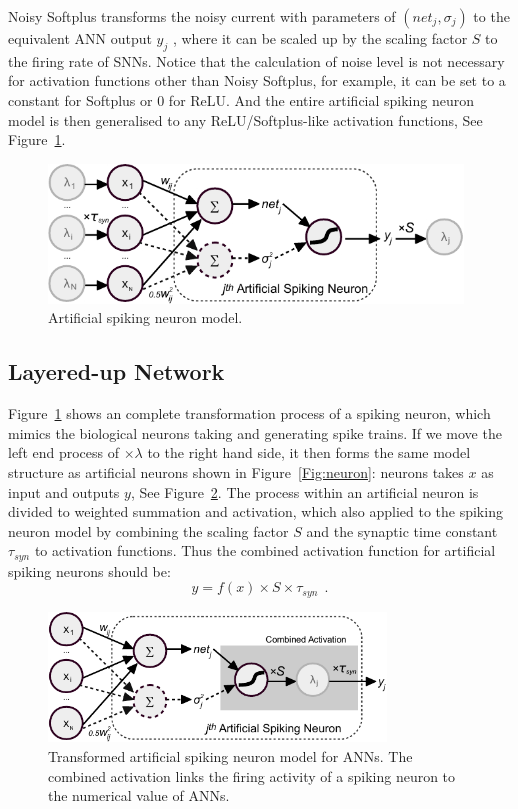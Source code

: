 	
	Noisy Softplus transforms the noisy current with parameters of $(net_j, \sigma_j)$ to the equivalent ANN output $y_j$ , where it can be scaled up by the scaling factor $S$ to the firing rate of SNNs.
	Notice that the calculation of noise level is not necessary for activation functions other than Noisy Softplus, for example, it can be set to a constant for Softplus or 0 for ReLU.
	And the entire artificial spiking neuron model is then generalised to any ReLU/Softplus-like activation functions, See Figure~\ref{Fig:sneuron}.
	
	\begin{figure}[bt]
		\centering
		\includegraphics[width=0.98\textwidth]{pics_sdlm/neuron_o.pdf}
		\caption{Artificial spiking neuron model. }
		\label{Fig:sneuron}
	\end{figure}
	
	
	\subsection{Layered-up Network}
	
	Figure~\ref{Fig:sneuron} shows an complete transformation process of a spiking neuron, which mimics the biological neurons taking and generating spike trains.
	If we move the left end process of $\times \lambda$ to the right hand side, it then forms the same model structure as artificial neurons shown in Figure~\ref{Fig:neuron}: neurons takes $x$ as input and outputs $y$, See Figure~\ref{Fig:tneuron}.
	The process within an artificial neuron is divided to weighted summation and activation, which also applied to the spiking neuron model by combining the scaling factor $S$ and the synaptic time constant $\tau_{syn}$ to activation functions.
	Thus the combined activation function for artificial spiking neurons should be:
	\begin{equation}
	y = f(x) \times S \times \tau_{syn}~~.
	\end{equation}
	\begin{figure}[tbh!]
		\centering
		\includegraphics[width=0.8\textwidth]{pics_sdlm/neuron_t.pdf}
		\caption{Transformed artificial spiking neuron model for ANNs. The combined activation links the firing activity of a spiking neuron to the numerical value of ANNs.}
		\label{Fig:tneuron}
	\end{figure}
	
